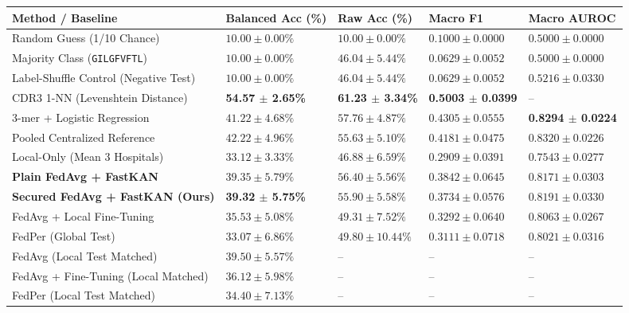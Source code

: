 \documentclass[11pt,a4paper]{report}
\begin{document}
\begin{center}
\small
\begin{longtable}{@{}p{4.6cm}>{\centering\arraybackslash}p{2.6cm}>{\centering\arraybackslash}p{2.4cm}>{\centering\arraybackslash}p{2.4cm}>{\centering\arraybackslash}p{2.8cm}@{}}
\toprule
\textbf{Method / Baseline} & \textbf{Balanced Acc (\%)} & \textbf{Raw Acc (\%)} & \textbf{Macro F1} & \textbf{Macro AUROC} \\
\midrule
\endhead
Random Guess (1/10 Chance)             & $10.00 \pm 0.00\%$ & $10.00 \pm 0.00\%$ & $0.1000 \pm 0.0000$ & $0.5000 \pm 0.0000$ \\
Majority Class (\lstinline|GILGFVFTL|) & $10.00 \pm 0.00\%$ & $46.04 \pm 5.44\%$ & $0.0629 \pm 0.0052$ & $0.5000 \pm 0.0000$ \\
Label-Shuffle Control (Negative Test)  & $10.00 \pm 0.00\%$ & $46.04 \pm 5.44\%$ & $0.0629 \pm 0.0052$ & $0.5216 \pm 0.0330$ \\
CDR3 1-NN (Levenshtein Distance)       & \textbf{54.57 $\pm$ 2.65\%} & \textbf{61.23 $\pm$ 3.34\%} & \textbf{0.5003 $\pm$ 0.0399} & -- \\
3-mer + Logistic Regression            & $41.22 \pm 4.68\%$ & $57.76 \pm 4.87\%$ & $0.4305 \pm 0.0555$ & \textbf{0.8294 $\pm$ 0.0224} \\
\midrule
Pooled Centralized Reference           & $42.22 \pm 4.96\%$ & $55.63 \pm 5.10\%$ & $0.4181 \pm 0.0475$ & $0.8320 \pm 0.0226$ \\
Local-Only (Mean 3 Hospitals)          & $33.12 \pm 3.33\%$ & $46.88 \pm 6.59\%$ & $0.2909 \pm 0.0391$ & $0.7543 \pm 0.0277$ \\
\midrule
\textbf{Plain FedAvg + FastKAN}        & $39.35 \pm 5.79\%$ & $56.40 \pm 5.56\%$ & $0.3842 \pm 0.0645$ & $0.8171 \pm 0.0303$ \\
\textbf{Secured FedAvg + FastKAN (Ours)} & \textbf{39.32 $\pm$ 5.75\%} & $55.90 \pm 5.58\%$ & $0.3734 \pm 0.0576$ & $0.8191 \pm 0.0330$ \\
\midrule
FedAvg + Local Fine-Tuning             & $35.53 \pm 5.08\%$ & $49.31 \pm 7.52\%$ & $0.3292 \pm 0.0640$ & $0.8063 \pm 0.0267$ \\
FedPer (Global Test)                   & $33.07 \pm 6.86\%$ & $49.80 \pm 10.44\%$ & $0.3111 \pm 0.0718$ & $0.8021 \pm 0.0316$ \\
\midrule
FedAvg (Local Test Matched)            & $39.50 \pm 5.57\%$ & -- & -- & -- \\
FedAvg + Fine-Tuning (Local Matched)   & $36.12 \pm 5.98\%$ & -- & -- & -- \\
FedPer (Local Test Matched)            & $34.40 \pm 7.13\%$ & -- & -- & -- \\
\bottomrule
\end{longtable}
\end{center}
\end{document}
